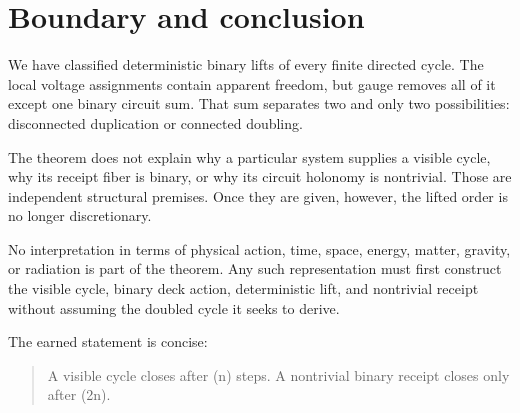 \section{Boundary and conclusion}

We have classified deterministic binary lifts of every finite directed cycle.
The local voltage assignments contain apparent freedom, but gauge removes all
of it except one binary circuit sum. That sum separates two and only two
possibilities: disconnected duplication or connected doubling.

The theorem does not explain why a particular system supplies a visible
cycle, why its receipt fiber is binary, or why its circuit holonomy is
nontrivial. Those are independent structural premises. Once they are given,
however, the lifted order is no longer discretionary.

No interpretation in terms of physical action, time, space, energy, matter,
gravity, or radiation is part of the theorem. Any such representation must
first construct the visible cycle, binary deck action, deterministic lift, and
nontrivial receipt without assuming the doubled cycle it seeks to derive.

The earned statement is concise:
\begin{quote}
A visible cycle closes after (n) steps. A nontrivial binary receipt closes
only after (2n).
\end{quote}


